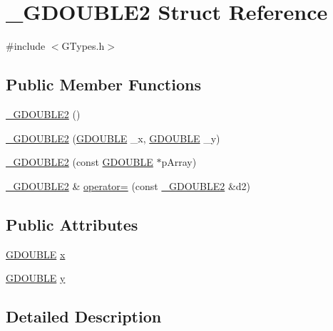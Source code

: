 \hypertarget{struct___g_d_o_u_b_l_e2}{}\section{\+\_\+\+G\+D\+O\+U\+B\+L\+E2 Struct Reference}
\label{struct___g_d_o_u_b_l_e2}


{\ttfamily \#include $<$G\+Types.\+h$>$}

\subsection*{Public Member Functions}
\begin{DoxyCompactItemize}
\item 
\hyperlink{struct___g_d_o_u_b_l_e2_a9e5d11f585a746d71408ab6295227038}{\+\_\+\+G\+D\+O\+U\+B\+L\+E2} ()
\item 
\hyperlink{struct___g_d_o_u_b_l_e2_aaec3f6dce11934a59262e6df643d08cc}{\+\_\+\+G\+D\+O\+U\+B\+L\+E2} (\hyperlink{_g_types_8h_afd05ac85f90ee8e2a733928545462cd4}{G\+D\+O\+U\+B\+L\+E} \+\_\+x, \hyperlink{_g_types_8h_afd05ac85f90ee8e2a733928545462cd4}{G\+D\+O\+U\+B\+L\+E} \+\_\+y)
\item 
\hyperlink{struct___g_d_o_u_b_l_e2_ac642290e4696200b9970e6e589cdf057}{\+\_\+\+G\+D\+O\+U\+B\+L\+E2} (const \hyperlink{_g_types_8h_afd05ac85f90ee8e2a733928545462cd4}{G\+D\+O\+U\+B\+L\+E} $\ast$p\+Array)
\item 
\hyperlink{struct___g_d_o_u_b_l_e2}{\+\_\+\+G\+D\+O\+U\+B\+L\+E2} \& \hyperlink{struct___g_d_o_u_b_l_e2_af843c9c1899ef506ccb11a4eb22f829c}{operator=} (const \hyperlink{struct___g_d_o_u_b_l_e2}{\+\_\+\+G\+D\+O\+U\+B\+L\+E2} \&d2)
\end{DoxyCompactItemize}
\subsection*{Public Attributes}
\begin{DoxyCompactItemize}
\item 
\hyperlink{_g_types_8h_afd05ac85f90ee8e2a733928545462cd4}{G\+D\+O\+U\+B\+L\+E} \hyperlink{struct___g_d_o_u_b_l_e2_afef009ac44d8d1602adf323a3d0d0d5b}{x}
\item 
\hyperlink{_g_types_8h_afd05ac85f90ee8e2a733928545462cd4}{G\+D\+O\+U\+B\+L\+E} \hyperlink{struct___g_d_o_u_b_l_e2_a31ea118973d237692042c8ef6434eba0}{y}
\end{DoxyCompactItemize}


\subsection{Detailed Description}

